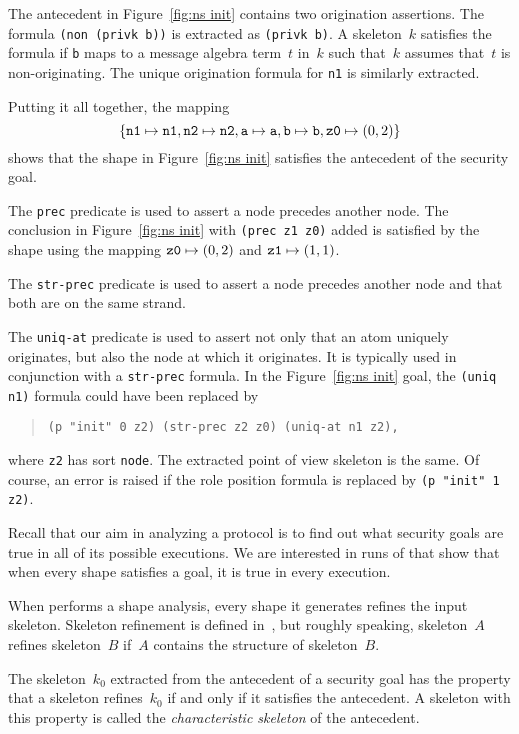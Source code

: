 \documentclass[12pt]{article}
\begin{document}
The antecedent in Figure~\ref{fig:ns init} contains two origination
assertions.  The formula \texttt{(non (privk b))} is extracted as
\texttt{(privk b)}.  A skeleton~$k$ satisfies the formula if
\texttt{b} maps to a message algebra term~$t$ in~$k$ such that~$k$
assumes that~$t$ is non-originating.  The unique origination formula for
\texttt{n1} is similarly extracted.

Putting it all together, the mapping
\[\{\mathtt{n1}\mapsto\mathtt{n1},
\mathtt{n2}\mapsto\mathtt{n2}, \mathtt{a}\mapsto\mathtt{a},
\mathtt{b}\mapsto\mathtt{b},\mbox{\tt z0}\mapsto(0,2)\}\] shows that
the shape in Figure~\ref{fig:ns init} satisfies the antecedent of the
security goal.

The \texttt{prec} predicate is used to assert a node precedes another
node.  The conclusion in Figure~\ref{fig:ns init} with \texttt{(prec
  z1 z0)} added is satisfied by the shape using the mapping $\mbox{\tt
  z0}\mapsto(0,2)$ and $\mbox{\tt z1}\mapsto(1,1)$.

The \texttt{str-prec} predicate is used to assert a node precedes another
node and that both are on the same strand.

The \texttt{uniq-at} predicate is used to assert not only that an atom
uniquely originates, but also the node at which it originates.  It is
typically used in conjunction with a \texttt{str-prec} formula.  In
the Figure~\ref{fig:ns init} goal, the \texttt{(uniq n1)} formula
could have been replaced by
\begin{quote}
\begin{verbatim}
(p "init" 0 z2) (str-prec z2 z0) (uniq-at n1 z2),
\end{verbatim}
\end{quote}
where \texttt{z2} has sort \texttt{node}.  The extracted point of view
skeleton is the same.  Of course, an error is raised if the role
position formula is replaced by \texttt{(p "init" 1 z2)}.

Recall that our aim in analyzing a protocol is to find out what
security goals are true in all of its possible executions.  We are
interested in runs of {\cpsa} that show that when every shape
satisfies a goal, it is true in every execution.

When {\cpsa} performs a shape analysis, every shape it generates
refines the input skeleton.  Skeleton refinement is defined
in~\cite[Section~6]{cpsaprimer09}, but roughly speaking, skeleton~$A$
refines skeleton~$B$ if~$A$ contains the structure of skeleton~$B$.

The skeleton~$k_0$ extracted from the antecedent of a security goal
has the property that a skeleton refines~$k_0$ if and only if it
satisfies the antecedent.  A skeleton with this property is called the
\emph{characteristic skeleton} of the antecedent.
\end{document}
